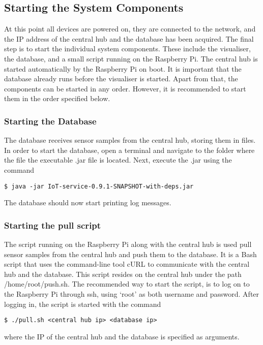 \documentclass[../document.tex]{subfiles}
\begin{document}
\subsection{Starting the System Components}
At this point all devices are powered on, they are connected to the network, and the IP address of the central hub and the database has been acquired. The final step is to start the individual system components. These include the visualiser, the database, and a small script running on the Raspberry Pi. The central hub is started automatically by the Raspberry Pi on boot. It is important that the database already runs before the visualiser is started. Apart from that, the components can be started in any order. However, it is recommended to start them in the order specified below.

\subsubsection{Starting the Database}
The database receives sensor samples from the central hub, storing them in files. In order to start the database, open a terminal and navigate to the folder where the file the executable .jar file is located. Next, execute the .jar using the command
\lstset{style=custombash}
\begin{lstlisting}
$ java -jar IoT-service-0.9.1-SNAPSHOT-with-deps.jar
\end{lstlisting}
The database should now start printing log messages.



\subsubsection{Starting the pull script}
The script running on the Raspberry Pi along with the central hub is used pull sensor samples from the central hub and push them to the database. It is a Bash script that uses the command-line tool cURL to communicate with the central hub and the database. This script resides on the central hub under the path /home/root/push.sh. The recommended way to start the script, is to log on to the Raspberry Pi through ssh, using ‘root’ as both username and password. After logging in, the script is started with the command
\lstset{style=custombash}
\begin{lstlisting}
$ ./pull.sh <central hub ip> <database ip>
\end{lstlisting}
where the IP of the central hub and the database is specified as arguments.
\end{document}
